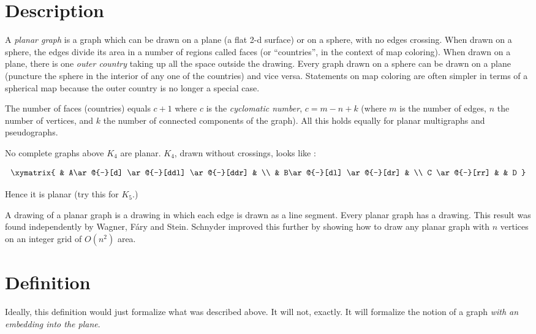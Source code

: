 \documentclass[12pt]{article}
\theoremstyle{definition}
\begin{document}

\section*{Description}

A \emph{planar graph} is a graph which can be drawn on a plane (a flat 2-d surface) or on a sphere, with no edges crossing. When drawn on a sphere, the edges divide its area in a number of regions called faces (or ``countries'', in the context of map coloring). When drawn on a plane, there is one \emph{outer country} taking up all the space outside the drawing. Every graph drawn on a sphere can be drawn on a plane (puncture the sphere in the interior of any one of the countries) and vice versa. Statements on map coloring are often simpler in terms of a spherical map because the outer country is no longer a special case.

The number of faces (countries) equals $c+1$ where $c$ is the \emph{cyclomatic number}, $c=m-n+k$ (where $m$ is the number of edges, $n$ the number of vertices, and $k$ the number of connected components of the graph). All this holds equally for planar multigraphs and pseudographs.

No complete graphs above $K_4$ are planar.  $K_4$, drawn without crossings, looks like :

$$ 
\xymatrix{
  & A\ar@{-}[d] \ar@{-}[ddl] \ar@{-}[ddr] &    \\
  & B\ar@{-}[dl] \ar@{-}[dr] &    \\
C \ar@{-}[rr] &   & D } 
$$

Hence it is planar (try this for $K_5$.)

A  drawing of a planar graph is a drawing in which each edge is drawn as a  line segment. Every planar graph has a  drawing. This result was found independently by Wagner, F\'ary and Stein. Schnyder improved this further by showing how to draw any planar graph with $n$ vertices on an integer grid of $O(n^2)$ area.

\section*{Definition}

Ideally, this definition would just formalize what was described above.  It will not, exactly.  It will formalize the notion of a graph \emph{with an embedding into the plane}.
\end{document}
